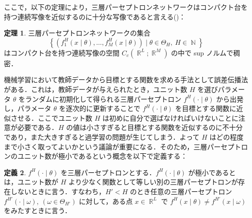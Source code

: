 \documentclass{jsarticle}
\DeclareMathOperator{\R}{\mathbb{R}}
\DeclareMathOperator{\N}{\mathbb{N}}
\theoremstyle{definition}
\newtheorem{thm}{定理}[section]
\newtheorem{defn}[thm]{定義}
\begin{document}
ここで，以下の定理により，三層パーセプトロンネットワークはコンパクト台を持つ連続写像を近似するのに十分な写像であると言える(\cite{cybenko})：
\begin{thm}
  三層パーセプトロンネットワークの集合
  \[
    \left\{ \left(f_1^H(x\mid \theta),\ldots, f_M^H(x \mid \theta)\right)\mid \theta \in \Theta_H,\ H \in \N\right\}
  \]
  はコンパクト台を持つ連続写像の空間 $C_c(\R^L;\R^M)$ の中で sup ノルムで稠密．
\end{thm}
機械学習において教師データから目標とする関数を求める手法として誤差伝播法がある．これは，教師データが与えられたとき，ユニット数 $H$ を選びパラメータ $\theta$ をランダムに初期化して得られる三層パーセプトロン $f^H(\cdot \mid \theta)$ から出発し，パラメータ $\theta$ を逐次的に更新することで $f^H(\cdot \mid \theta)$ を目標とする関数に近似させる．ここでユニット数 $H$ は初めに自分で選ばなければいけないことに注意が必要である．$H$ の値は小さすぎると目標とする関数を近似するのに不十分であり，また大きすぎると過学習の問題が生じてしまう．よって $H$ はどの程度まで小さく取ってよいかという議論が重要になる．そのため，三層パーセプトロンのユニット数が極小であるという概念を以下で定義する：
\begin{defn}
  $f^H(\cdot \mid \theta)$ を三層パーセプトロンとする．$f^H(\cdot \mid \theta)$ が極小であるとは，ユニット数が $H$ より少なく関数として等しい別の三層パーセプトロンが存在しないときに言う．すなわち，$H' < H$ のとき任意の三層パーセプトロン $f^{H'}(\cdot \mid \omega), \ (\omega \in \Theta_{H'})$ に対して，ある点 $x \in \R^L$ で $f^H(x\mid \theta) \neq f^{H'}(x \mid \omega)$ をみたすときに言う．
\end{defn}
\end{document}
